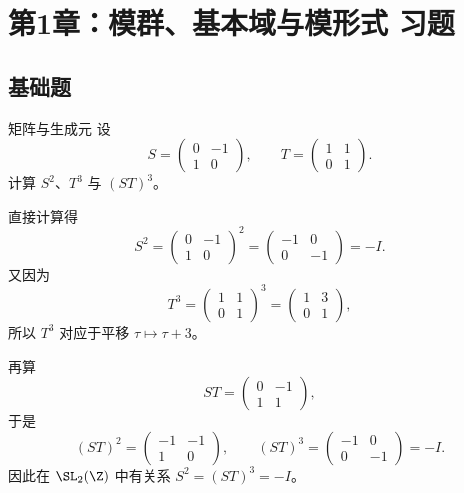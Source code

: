 \chapter{第1章：模群、基本域与模形式 习题}
\difficultykey

\section{基础题 \easy}

\begin{problem}{矩阵与生成元}
\easy
设
\[
S=\begin{pmatrix}0&-1\\1&0\end{pmatrix},\qquad
T=\begin{pmatrix}1&1\\0&1\end{pmatrix}.
\]
计算 $S^2$、$T^3$ 与 $(ST)^3$。
\end{problem}
\begin{solution}
直接计算得
\[
S^2=\begin{pmatrix}0&-1\\1&0\end{pmatrix}^2=
\begin{pmatrix}-1&0\\0&-1\end{pmatrix}=-I.
\]
又因为
\[
T^3=\begin{pmatrix}1&1\\0&1\end{pmatrix}^3=
\begin{pmatrix}1&3\\0&1\end{pmatrix},
\]
所以 $T^3$ 对应于平移 $\tau\mapsto \tau+3$。

再算
\[
ST=\begin{pmatrix}0&-1\\1&1\end{pmatrix},
\]
于是
\[
(ST)^2=\begin{pmatrix}-1&-1\\1&0\end{pmatrix},\qquad
(ST)^3=\begin{pmatrix}-1&0\\0&-1\end{pmatrix}=-I.
\]
因此在 $\SL_2(\Z)$ 中有关系 $S^2=(ST)^3=-I$。
\end{solution}

